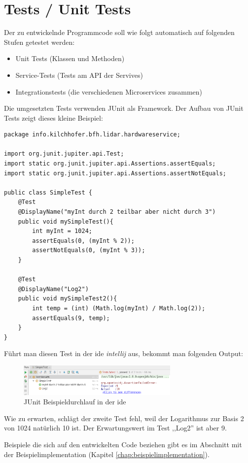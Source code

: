 \section{Tests / Unit Tests}
\label{sec:tests_and_unittests}
Der zu entwickelnde Programmcode soll wie folgt automatisch auf folgenden Stufen getestet werden:
\begin{itemize}
	\item Unit Tests (Klassen und Methoden)
	\item Service-Tests (Tests am API der Servives)
	\item Integrationstests (die verschiedenen Microservices zusammen)
\end{itemize}
Die umgesetzten Tests verwenden JUnit als Framework.  Der Aufbau von JUnit Tests zeigt dieses kleine Beispiel:
\begin{lstlisting}[caption={Simples Beispiel wie JUnit funktioniert},label={lst:junit-example-simple}]
package info.kilchhofer.bfh.lidar.hardwareservice;

import org.junit.jupiter.api.Test;
import static org.junit.jupiter.api.Assertions.assertEquals;
import static org.junit.jupiter.api.Assertions.assertNotEquals;

public class SimpleTest {
	@Test
	@DisplayName("myInt durch 2 teilbar aber nicht durch 3")
	public void mySimpleTest(){
		int myInt = 1024;
		assertEquals(0, (myInt % 2));
		assertNotEquals(0, (myInt % 3));
	}
	
	@Test
	@DisplayName("Log2")
	public void mySimpleTest2(){
		int temp = (int) (Math.log(myInt) / Math.log(2));
		assertEquals(9, temp);
	}
}
\end{lstlisting}
Führt man diesen Test in der \acrshort{ide} \textit{\Gls{intellij}} aus, bekommt man folgenden Output:
\begin{figure}[H]
	\centering
	\includegraphics[width=0.7\textwidth]{img/junit-example-ide.png}
	\caption{JUnit Beispieldurchlauf in der \acrshort{ide}}
	\label{fig:junit-example}
\end{figure}
Wie zu erwarten, schlägt der zweite Test fehl, weil der Logarithmus zur Basis 2 von 1024 natürlich 10 ist. Der Erwartungswert im Test ,,Log2'' ist aber 9.

Beispiele die sich auf den entwickelten Code beziehen gibt es im Abschnitt mit der Beispielimplementation (Kapitel \ref{chap:beispielimplementation}).

